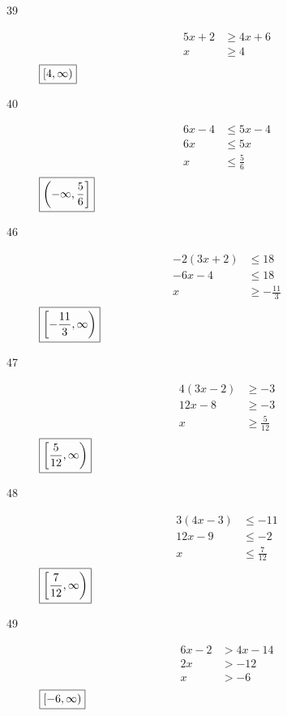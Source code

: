 \documentclass[letterpaper, landscape]{exam}
\begin{document}
\begin{description}
      \item[39]
        \begin{align*}
          5x + 2 & \geq 4x + 6 \\
          x      & \geq 4 \\
        \end{align*}
        $\boxed{ \intco{ 4, \infty } }$

      \item[40]
        \begin{align*}
          6x - 4 & \leq 5x - 4 \\
          6x & \leq 5x \\
          x      & \leq \frac{5}{6} \\
        \end{align*}
        $\boxed{ \intoc{ -\infty, \frac{5}{6} } }$

      \item[46]
        \begin{align*}
          -2(3x + 2) & \leq 18 \\
          -6x - 4    & \leq 18 \\
          x          & \geq - \frac{11}{3} \\
        \end{align*}
        $\boxed{ \intco{ -\frac{11}{3}, \infty } }$

      \item[47]
        \begin{align*}
          4 (3x - 2) & \geq -3 \\
          12x - 8    & \geq -3 \\
          x          & \geq \frac{5}{12} \\
        \end{align*}
        $\boxed{ \intco{ \frac{5}{12}, \infty } }$

      \item[48]
        \begin{align*}
          3 (4x - 3) & \leq -11 \\
          12x - 9    & \leq -2 \\
          x          & \leq \frac{7}{12} \\
        \end{align*}
        $\boxed{ \intco{ \frac{7}{12}, \infty } }$

      \item[49]
        \begin{align*}
          6x - 2 & > 4x - 14 \\
          2x     & > -12 \\
          x      & > -6 \\
        \end{align*}
        $\boxed{ \intco{ -6, \infty } }$


\end{description}
\end{document}
